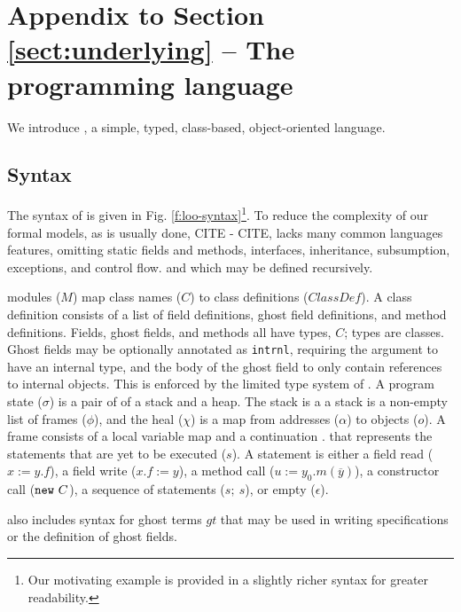 \section{Appendix to Section \ref{sect:underlying} -- The programming language \LangOO}
\label{app:loo}


We introduce \LangOO, a simple, typed, class-based, object-oriented language.



\subsection{Syntax}

The syntax of \LangOO is given in Fig. \ref{f:loo-syntax}\footnote{{Our motivating example is provided in a slightly richer syntax for greater readability.}}.
To reduce the complexity of our formal models, as is usually done, CITE - CITE,  \LangOO lacks many
common languages features, omitting static fields and methods, interfaces,
inheritance, subsumption, exceptions, and control flow.  
 \LangOO %
and which may be defined recursively.

\LangOO modules ($M$) map class names ($C$) to class definitions ($\textit{ClassDef}$).
A class definition consists of %
a list of field definitions, ghost field definitions, and method definitions.
{Fields, ghost fields, and methods all have types, $C$; {types are
    classes}.
    Ghost fields may be optionally 
 annotated as \texttt{intrnl}, requiring the argument to have an internal type, and the 
body of the ghost field to only contain references to internal objects. This is enforced by the
limited type system of \LangOO.}
A program state ($\sigma$) is a pair of of a stack and a heap.
The stack is a a stack is a non-empty list of frames ($\phi$), and the heal ($\chi$)
is a map from addresses ($\alpha$) to objects ($o$). A frame consists of a local variable
map and a continuation . that represents the statements that are yet to be executed ($s$).
A statement is either a field read ($x := y.f$), a field write ($x.f := y$), a method call
($u :=y_0.m(\overline{y})$), a constructor call ($\mbox{\normalfont{\texttt{new}}}\ C$), 
  a sequence of statements ($s;\ s$),
  or empty ($\epsilon$).


\LangOO also includes syntax for ghost terms $gt$ that may %
be used in writing
specifications or the definition of ghost fields.





